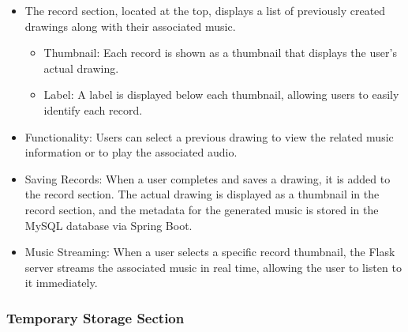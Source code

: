 \documentclass[conference]{IEEEtran}
\begin{document}
\begin{itemize}
    \item The record section, located at the top, displays a list of previously created drawings along with their associated music.
\begin{itemize}
    \item Thumbnail: Each record is shown as a thumbnail that displays the user’s actual drawing.\\
    \item Label: A label is displayed below each thumbnail, allowing users to easily identify each record.\\
\end{itemize}
    \item Functionality: Users can select a previous drawing to view the related music information or to play the associated audio.\\
    \item Saving Records: When a user completes and saves a drawing, it is added to the record section. The actual drawing is displayed as a thumbnail in the record section, and the metadata for the generated music is stored in the MySQL database via Spring Boot.\\
    \item Music Streaming: When a user selects a specific record thumbnail, the Flask server streams the associated music in real time, allowing the user to listen to it immediately.\\
\end{itemize}

\subsubsection{Temporary Storage Section}
\end{document}
